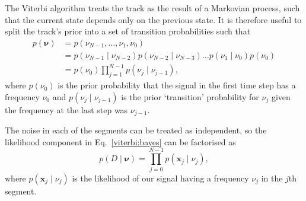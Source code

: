 The Viterbi algorithm treats the track as the result of a Markovian process,
such that the current state depends only on the previous state. It is
therefore useful to split the track's prior into a set of transition
probabilities such that
%
\begin{align}
\label{viterbi:prior}
p({\bm \nu}) &= p(\nu_{N - 1}, \ldots, \nu_1, \nu_0)\nonumber \\
&= p(\nu_{N - 1} \mid \nu_{N-2})p(\nu_{N-2} \mid \nu_{N-3}) \dots p(\nu_1 \mid \nu_0)p(\nu_0) \nonumber \\
&= p(\nu_0)\prod_{j=1}^{N-1}p(\nu_{j} \mid \nu_{j-1}),
\end{align}
%
where $p(\nu_0)$ is the prior probability that the signal in the first time
step has a frequency $\nu_0$ and $p(\nu_{j} \mid \nu_{j-1})$ is the
prior `transition' probability for $\nu_j$ given the frequency at the last
step was $\nu_{j-1}$.

The noise in each of the segments can be treated as independent, so the
likelihood component in Eq.~\ref{viterbi:bayes} can be factorised as
%
\begin{equation}
\label{viterbi:likelihood}
p(D \mid {\bm \nu}) = \prod_{j=0}^{N-1}p({\bm x_j} \mid \nu_j),
\end{equation}
%
 where $p({\bm x_j} \mid \nu_j)$ is the likelihood of our
signal having a frequency $\nu_j$ in the $j$th segment.

